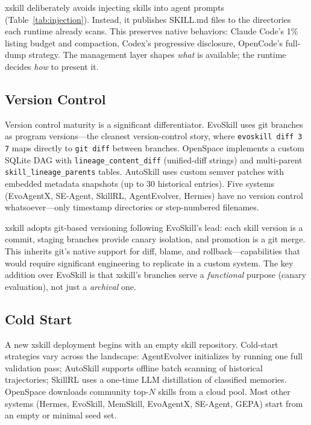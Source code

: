 \documentclass{article}
\begin{document}
xskill deliberately avoids injecting skills into agent prompts (Table~\ref{tab:injection}). Instead, it publishes SKILL.md files to the directories each runtime already scans. This preserves native behaviors: Claude Code's 1\% listing budget and compaction, Codex's progressive disclosure, OpenCode's full-dump strategy. The management layer shapes \emph{what} is available; the runtime decides \emph{how} to present it.

\subsection{Version Control}
\label{sec:versioncontrol}

Version control maturity is a significant differentiator. EvoSkill uses git branches as program versions---the cleanest version-control story, where \texttt{evoskill diff 3 7} maps directly to \texttt{git diff} between branches. OpenSpace implements a custom SQLite DAG with \texttt{lineage\_content\_diff} (unified-diff strings) and multi-parent \texttt{skill\_lineage\_parents} tables. AutoSkill uses custom semver patches with embedded metadata snapshots (up to 30 historical entries). Five systems (EvoAgentX, SE-Agent, SkillRL, AgentEvolver, Hermes) have no version control whatsoever---only timestamp directories or step-numbered filenames.

xskill adopts git-based versioning following EvoSkill's lead: each skill version is a commit, staging branches provide canary isolation, and promotion is a git merge. This inherits git's native support for diff, blame, and rollback---capabilities that would require significant engineering to replicate in a custom system. The key addition over EvoSkill is that xskill's branches serve a \emph{functional} purpose (canary evaluation), not just a \emph{archival} one.

\subsection{Cold Start}
\label{sec:coldstart}

A new xskill deployment begins with an empty skill repository. Cold-start strategies vary across the landscape: AgentEvolver initializes by running one full validation pass; AutoSkill supports offline batch scanning of historical trajectories; SkillRL uses a one-time LLM distillation of classified memories. OpenSpace downloads community top-$N$ skills from a cloud pool. Most other systems (Hermes, EvoSkill, MemSkill, EvoAgentX, SE-Agent, GEPA) start from an empty or minimal seed set.
\end{document}
